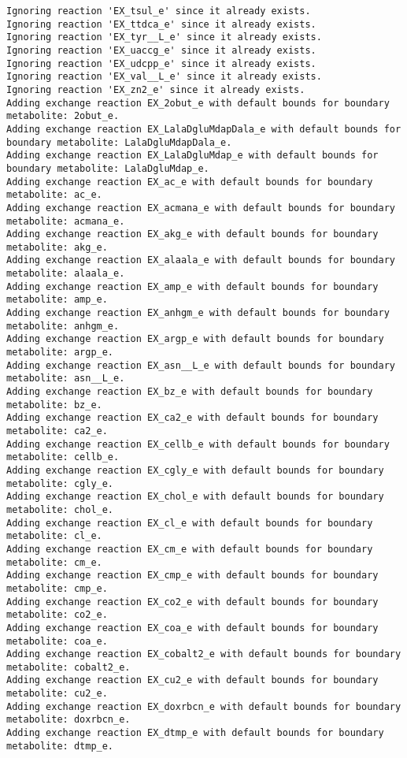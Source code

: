 \documentclass[
  letterpaper,
  DIV=11,
  numbers=noendperiod]{scrartcl}
\begin{document}
\begin{verbatim}
Ignoring reaction 'EX_tsul_e' since it already exists.
Ignoring reaction 'EX_ttdca_e' since it already exists.
Ignoring reaction 'EX_tyr__L_e' since it already exists.
Ignoring reaction 'EX_uaccg_e' since it already exists.
Ignoring reaction 'EX_udcpp_e' since it already exists.
Ignoring reaction 'EX_val__L_e' since it already exists.
Ignoring reaction 'EX_zn2_e' since it already exists.
Adding exchange reaction EX_2obut_e with default bounds for boundary metabolite: 2obut_e.
Adding exchange reaction EX_LalaDgluMdapDala_e with default bounds for boundary metabolite: LalaDgluMdapDala_e.
Adding exchange reaction EX_LalaDgluMdap_e with default bounds for boundary metabolite: LalaDgluMdap_e.
Adding exchange reaction EX_ac_e with default bounds for boundary metabolite: ac_e.
Adding exchange reaction EX_acmana_e with default bounds for boundary metabolite: acmana_e.
Adding exchange reaction EX_akg_e with default bounds for boundary metabolite: akg_e.
Adding exchange reaction EX_alaala_e with default bounds for boundary metabolite: alaala_e.
Adding exchange reaction EX_amp_e with default bounds for boundary metabolite: amp_e.
Adding exchange reaction EX_anhgm_e with default bounds for boundary metabolite: anhgm_e.
Adding exchange reaction EX_argp_e with default bounds for boundary metabolite: argp_e.
Adding exchange reaction EX_asn__L_e with default bounds for boundary metabolite: asn__L_e.
Adding exchange reaction EX_bz_e with default bounds for boundary metabolite: bz_e.
Adding exchange reaction EX_ca2_e with default bounds for boundary metabolite: ca2_e.
Adding exchange reaction EX_cellb_e with default bounds for boundary metabolite: cellb_e.
Adding exchange reaction EX_cgly_e with default bounds for boundary metabolite: cgly_e.
Adding exchange reaction EX_chol_e with default bounds for boundary metabolite: chol_e.
Adding exchange reaction EX_cl_e with default bounds for boundary metabolite: cl_e.
Adding exchange reaction EX_cm_e with default bounds for boundary metabolite: cm_e.
Adding exchange reaction EX_cmp_e with default bounds for boundary metabolite: cmp_e.
Adding exchange reaction EX_co2_e with default bounds for boundary metabolite: co2_e.
Adding exchange reaction EX_coa_e with default bounds for boundary metabolite: coa_e.
Adding exchange reaction EX_cobalt2_e with default bounds for boundary metabolite: cobalt2_e.
Adding exchange reaction EX_cu2_e with default bounds for boundary metabolite: cu2_e.
Adding exchange reaction EX_doxrbcn_e with default bounds for boundary metabolite: doxrbcn_e.
Adding exchange reaction EX_dtmp_e with default bounds for boundary metabolite: dtmp_e.

\end{verbatim}
\end{document}
